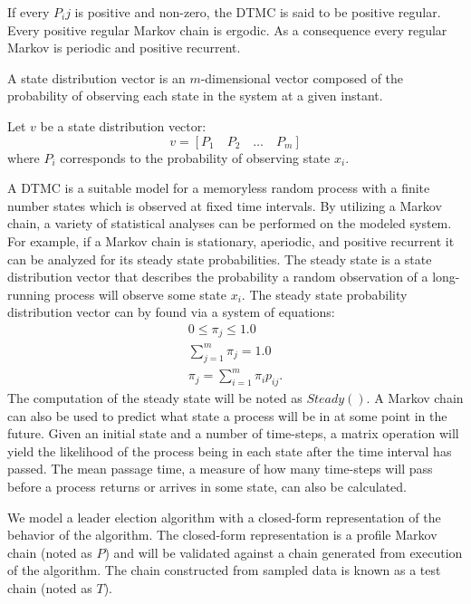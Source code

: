 If every $P_ij$ is positive and non-zero, the DTMC is said to be positive regular.
Every positive regular Markov chain is ergodic\cite{finite-markov}.
As a consequence every regular Markov is periodic and positive recurrent.

\begin{pdef}
A state distribution vector is an $m$-dimensional vector composed of the probability of observing each state in the system at a given instant.
\end{pdef}

Let $v$ be a state distribution vector:
\[ v = [P_{1} \quad P_{2} \quad \ldots \quad P_{m} ] \]
where $P_{i}$ corresponds to the probability of observing state $x_i$.

A \ac{DTMC} is a suitable model for a memoryless random process with a finite number states which is observed at fixed time intervals.
By utilizing a Markov chain, a variety of statistical analyses can be performed on the modeled system.
For example, if a Markov chain is stationary, aperiodic, and positive recurrent it can be analyzed for its steady state probabilities.
The steady state is a state distribution vector that describes the probability a random observation of a long-running process will observe some state $x_i$.
The steady state probability distribution vector can by found via a system of equations: \cite{MARKOV3}
\begin{align}
0\leq\pi_j\leq1.0 \\
\sum_{j = 1}^{m}\pi_j = 1.0 \\
\pi_j = \sum_{i=1}^{m} \pi_i p_{ij}.
\end{align}
The computation of the steady state will be noted as $Steady()$.
A Markov chain can also be used to predict what state a process will be in at some point in the future.
Given an initial state and a number of time-steps, a matrix operation will yield the likelihood of the process being in each state after the time interval has passed.
The mean passage time, a measure of how many time-steps will pass before a process returns or arrives in some state, can also be calculated.

We model a leader election algorithm with a closed-form representation of the behavior of the algorithm.
The closed-form representation is a profile Markov chain (noted as $P$) and will be validated against a chain generated from execution of the algorithm.
The chain constructed from sampled data is known as a test chain (noted as $T$).

